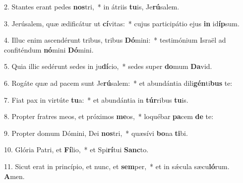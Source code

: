 2. Stantes erant pedes \textbf{nos}tri,~*  in átriis \textbf{tu}is, Je\textbf{rú}salem.\

3. Jerúsalem, quæ ædificátur ut \textbf{cí}vitas:~*  cujus participátio ejus \textbf{in} id\textbf{íp}sum.\

4. Illuc enim ascendérunt tribus, tribus \textbf{Dó}mini:~*  testimónium Israël ad confiténdum \textbf{nó}mini \textbf{Dó}mini.\

5. Quia illic sedérunt sedes in ju\textbf{dí}cio,~*  sedes super \textbf{do}mum \textbf{Da}vid.\

6. Rogáte quæ ad pacem sunt Je\textbf{rú}salem:~*  et abundántia dili\textbf{gén}ti\textbf{bus} te:\

7. Fiat pax in virtúte \textbf{tu}a:~*  et abundántia in \textbf{túr}ribus \textbf{tu}is.\

8. Propter fratres meos, et próximos \textbf{me}os,~*  loquébar \textbf{pa}cem \textbf{de} te:\

9. Propter domum Dómini, Dei \textbf{nos}tri,~*  quæsívi \textbf{bo}na \textbf{ti}bi.\

10. Glória Patri, et \textbf{Fí}lio,~*  et Spi\textbf{rí}tui \textbf{Sanc}to.\

11. Sicut erat in princípio, et nunc, et \textbf{sem}per,~*  et in sǽcula sæcu\textbf{ló}rum. \textbf{A}men.\

